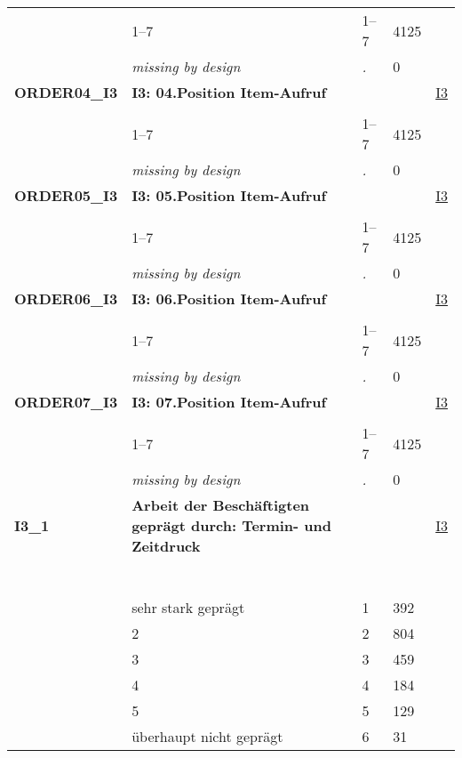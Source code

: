 \begin{longtable}{| L{2.65cm} | L{8cm} | C{1.5cm} | R{1.25cm} | C{2.25cm}  |}
   & 1--7 & 1--7 & 4125 &  \\ 
   & \textit{missing by design} & \textit{.} & 0 &  \\ 
   \midrule
\textbf{ORDER04\_I3}\label{var:ORDER04:I3} & \textbf{I3: 04.Position Item-Aufruf} &  &  & \hyperref[I3]{I3} \\ 
   &  &  &  &  \\ 
   & 1--7 & 1--7 & 4125 &  \\ 
   & \textit{missing by design} & \textit{.} & 0 &  \\ 
   \midrule
\textbf{ORDER05\_I3}\label{var:ORDER05:I3} & \textbf{I3: 05.Position Item-Aufruf} &  &  & \hyperref[I3]{I3} \\ 
   &  &  &  &  \\ 
   & 1--7 & 1--7 & 4125 &  \\ 
   & \textit{missing by design} & \textit{.} & 0 &  \\ 
   \midrule
\textbf{ORDER06\_I3}\label{var:ORDER06:I3} & \textbf{I3: 06.Position Item-Aufruf} &  &  & \hyperref[I3]{I3} \\ 
   &  &  &  &  \\ 
   & 1--7 & 1--7 & 4125 &  \\ 
   & \textit{missing by design} & \textit{.} & 0 &  \\ 
   \midrule
\textbf{ORDER07\_I3}\label{var:ORDER07:I3} & \textbf{I3: 07.Position Item-Aufruf} &  &  & \hyperref[I3]{I3} \\ 
   &  &  &  &  \\ 
   & 1--7 & 1--7 & 4125 &  \\ 
   & \textit{missing by design} & \textit{.} & 0 &  \\ 
   \midrule
\textbf{I3\_1}\label{var:I3:1} & \textbf{Arbeit der Beschäftigten geprägt durch: Termin- und Zeitdruck} &  &  & \hyperref[I3]{I3} \\ 
   & \protect\subsection[Variablen I3\_1 bis I1]{} &  &  &  \\ 
   & sehr stark geprägt & 1 & 392 &  \\ 
   & 2 & 2 & 804 &  \\ 
   & 3 & 3 & 459 &  \\ 
   & 4 & 4 & 184 &  \\ 
   & 5 & 5 & 129 &  \\ 
   & überhaupt nicht geprägt & 6 & 31 &  \\ 

\end{longtable}
